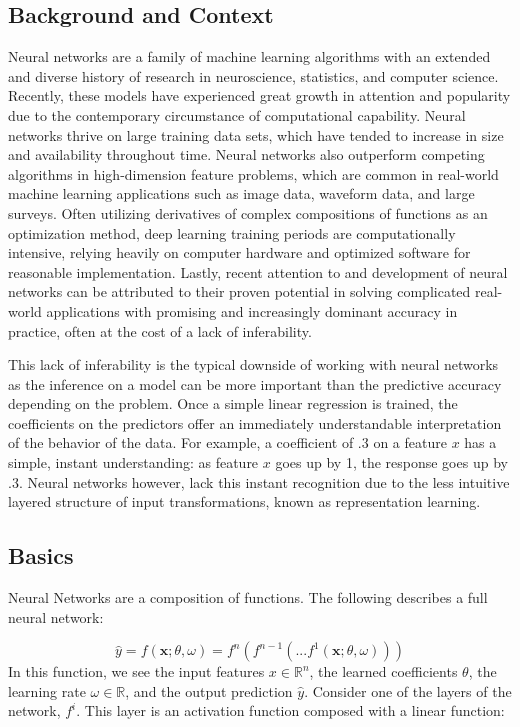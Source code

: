 \documentclass[12pt,twoside]{reedthesis}
\begin{document}
\subsection{Background and Context}\label{background-and-context}

Neural networks are a family of machine learning algorithms with an
extended and diverse history of research in neuroscience, statistics,
and computer science. Recently, these models have experienced great
growth in attention and popularity due to the contemporary circumstance
of computational capability. Neural networks thrive on large training
data sets, which have tended to increase in size and availability
throughout time. Neural networks also outperform competing algorithms in
high-dimension feature problems, which are common in real-world machine
learning applications such as image data, waveform data, and large
surveys. Often utilizing derivatives of complex compositions of
functions as an optimization method, deep learning training periods are
computationally intensive, relying heavily on computer hardware and
optimized software for reasonable implementation. Lastly, recent
attention to and development of neural networks can be attributed to
their proven potential in solving complicated real-world applications
with promising and increasingly dominant accuracy in practice, often at
the cost of a lack of inferability.

This lack of inferability is the typical downside of working with neural
networks as the inference on a model can be more important than the
predictive accuracy depending on the problem. Once a simple linear
regression is trained, the coefficients on the predictors offer an
immediately understandable interpretation of the behavior of the data.
For example, a coefficient of .3 on a feature \(x\) has a simple,
instant understanding: as feature \(x\) goes up by 1, the response goes
up by .3. Neural networks however, lack this instant recognition due to
the less intuitive layered structure of input transformations, known as
representation learning.

\subsection{Basics}\label{basics}

Neural Networks are a composition of functions. The following describes
a full neural network:

\[
\hat y = f(\boldsymbol{x}; \theta, \omega) = f^n ( f^{n-1}  ( ... f^1(\boldsymbol{x}; \theta, \omega)))
\] In this function, we see the input features \(x \in \mathbb{R}^n\),
the learned coefficients \(\theta\), the learning rate
\(\omega \in \mathbb{R}\), and the output prediction \(\hat{y}\).
Consider one of the layers of the network, \(f^i\). This layer is an
activation function composed with a linear function:
\end{document}
